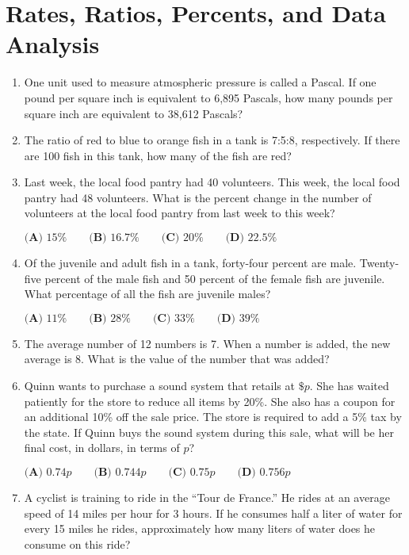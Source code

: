\documentclass[../satmath.tex]{subfiles}
\begin{document}
\chapter{Rates, Ratios, Percents, and Data Analysis}
\begin{enumerate}[label=\bfseries\arabic*.]

\item One unit used to measure atmospheric pressure is called a Pascal. If one pound per square inch is equivalent to 6,895 Pascals, how many 
pounds per square inch are equivalent to 38,612 Pascals?

\item The ratio of red to blue to orange fish in a tank is 7:5:8, respectively. If there are 100 fish in this tank, how many of the fish are red?

\item Last week, the local food pantry had 40 volunteers. This week, the local food pantry had 48 volunteers. What is the percent change in the number 
of volunteers at the local food pantry from last week to this week?

$\textbf{(A) } 15\% \qquad \textbf{(B) } 16.7\% \qquad \textbf{(C) } 20\% \qquad \textbf{(D) } 22.5\%$

\item Of the juvenile and adult fish in a tank, forty-four percent are male. Twenty-five percent of the male fish and 50 percent of the female fish 
are juvenile. What percentage of all the fish are juvenile males?

$\textbf{(A) } 11\% \qquad \textbf{(B) } 28\% \qquad \textbf{(C) } 33\% \qquad \textbf{(D) } 39\%$ 
 
\item The average number of 12 numbers is 7. When a number is added, the new average is 8. What is the value of the number that was added?
 
\item Quinn wants to purchase a sound system that retails at $\$p$. She has waited patiently for the store to reduce all items by 20\%. She also 
has a coupon for an additional 10\% off the sale price. The store is required to add a 5\% tax by the state. If Quinn buys the sound system during this sale, 
what will be her final cost, in dollars, in terms of $p$?

$\textbf{(A) } 0.74p \qquad \textbf{(B) } 0.744p \qquad \textbf{(C) } 0.75p \qquad \textbf{(D) } 0.756p$

\item A cyclist is training to ride in the ``Tour de France.'' He rides at an average speed of 14 miles per hour for 3 hours. If he consumes half a liter 
of water for every 15 miles he rides, approximately how many liters of water does he consume on this ride?
 

\end{enumerate}
\end{document}
